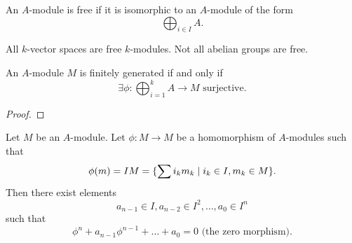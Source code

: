 \begin{df}
  An $A$-module is free if it is isomorphic to an $A$-module of the form
  \[ \bigoplus_{i \in I} A.\]
\end{df}

\begin{example}
  All $k$-vector spaces are free $k$-modules. Not all abelian groups are free.
\end{example}

\begin{lemma}
  An $A$-module $M$ is finitely generated if and only if
  \[ \exists \phi: \bigoplus_{i=1}^k A \to M \text{ surjective}.\]
\end{lemma}
\begin{proof}
\end{proof}

\begin{theorem}
  Let $M$ be an $A$-module. Let $\phi: M \to M$ be a homomorphism of $A$-modules such that
  \[ \phi(m) = IM = \{ \sum i_k m_k \mathrel{|} i_k \in I, m_k \in M \}. \]
  Then there exist elements
  \[ a_{n-1} \in I, a_{n-2} \in I^2, \ldots, a_0 \in I^n \]
  such that
  \[ \phi^n + a_{n-1} \phi^{n-1} + \ldots + a_0 = 0 \text{ (the zero morphism)}. \]
\end{theorem}

